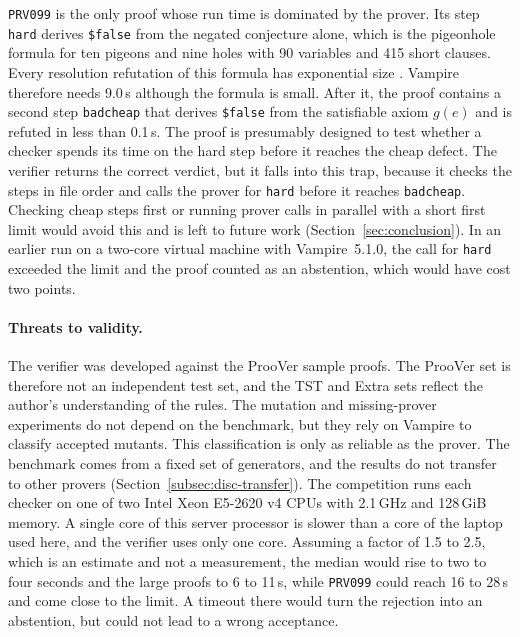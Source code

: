 \texttt{PRV099} is the only proof whose run time is dominated by the prover.
Its step \texttt{hard} derives \texttt{\$false} from the negated conjecture alone, which is the pigeonhole formula for ten pigeons and nine holes with 90 variables and 415 short clauses.
Every resolution refutation of this formula has exponential size \citep{Haken1985}. Vampire therefore needs 9.0\,s although the formula is small.
After it, the proof contains a second step \texttt{badcheap} that derives \texttt{\$false} from the satisfiable axiom $g(e)$ and is refuted in less than 0.1\,s.
The proof is presumably designed to test whether a checker spends its time on the hard step before it reaches the cheap defect.
The verifier returns the correct verdict, but it falls into this trap, because it checks the steps in file order and calls the prover for \texttt{hard} before it reaches \texttt{badcheap}.
Checking cheap steps first or running prover calls in parallel with a short first limit would avoid this and is left to future work (Section~\ref{sec:conclusion}).
In an earlier run on a two-core virtual machine with Vampire~5.1.0, the call for \texttt{hard} exceeded the limit and the proof counted as an abstention, which would have cost two points.

\paragraph{Threats to validity.}
\label{subsec:eval-threats}

The verifier was developed against the ProoVer sample proofs. The ProoVer set is therefore not an independent test set, and the TST and Extra sets reflect the author's understanding of the rules.
The mutation and missing-prover experiments do not depend on the benchmark, but they rely on Vampire to classify accepted mutants. This classification is only as reliable as the prover.
The benchmark comes from a fixed set of generators, and the results do not transfer to other provers (Section~\ref{subsec:disc-transfer}).
The competition runs each checker on one of two Intel Xeon E5-2620 v4 CPUs with 2.1\,GHz and 128\,GiB memory.
A single core of this server processor is slower than a core of the laptop used here, and the verifier uses only one core.
Assuming a factor of 1.5 to 2.5, which is an estimate and not a measurement, the median would rise to two to four seconds and the large proofs to 6 to 11\,s, while \texttt{PRV099} could reach 16 to 28\,s and come close to the limit.
A timeout there would turn the rejection into an abstention, but could not lead to a wrong acceptance.
